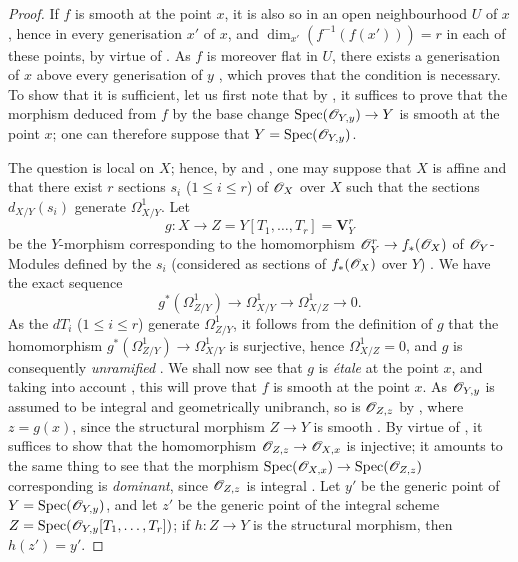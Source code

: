 \begin{proof}
If $f$ is smooth at the point $x$, it is also so in an open neighbourhood $U$ of $x$, hence in every generisation $x'$ of $x$, and $\dim_{x'}(f^{-1}(f(x')))=r$ in each of these points, by virtue of .
As $f$ is moreover flat in $U$, there exists a generisation of $x$ above every generisation of $y$ , which proves that the condition is necessary.
To show that it is sufficient, let us first note that by , it suffices to prove that the morphism deduced from $f$ by the base change $\operatorname{Spec}(\mathscr{O}_{Y,y})\to Y$ is smooth at the point $x$; one can therefore suppose that $Y=\operatorname{Spec}(\mathscr{O}_{Y,y})$.

The question is local on $X$; hence, by  and , one may suppose that $X$ is affine and that there exist $r$ sections $s_i$ ($1\leq i\leq r$) of $\mathscr{O}_X$ over $X$ such that the sections $d_{X/Y}(s_i)$ generate $\varOmega^1_{X/Y}$.
Let
\[
  g:X\to Z=Y[T_1,\ldots,T_r]=\mathbf{V}_{Y}^r
\]
be the $Y$-morphism corresponding to the homomorphism $\mathscr{O}_{Y}^r\to f_*(\mathscr{O}_X)$ of $\mathscr{O}_Y$-Modules defined by the $s_i$ (considered as sections of $f_*(\mathscr{O}_X)$ over $Y$) .
We have the exact sequence 
\[
  g^*(\varOmega^1_{Z/Y})\to\varOmega^1_{X/Y}\to\varOmega^1_{X/Z}\to 0.
\]
As the $dT_i$ ($1\leq i\leq r$) generate $\varOmega^1_{Z/Y}$, it follows from the definition of $g$ that the homomorphism $g^*(\varOmega^1_{Z/Y})\to\varOmega^1_{X/Y}$ is surjective, hence $\varOmega^1_{X/Z}=0$, and $g$ is consequently \emph{unramified} .
We shall now see that $g$ is \emph{\'etale} at the point $x$, and taking into account , this will prove that $f$ is smooth at the point $x$.
As $\mathscr{O}_{Y,y}$ is assumed to be integral and geometrically
unibranch, so is $\mathscr{O}_{Z,z}$ by , where $z=g(x)$, since the structural morphism $Z\to Y$ is smooth .
By virtue of , it suffices to show that the homomorphism $\mathscr{O}_{Z,z}\to\mathscr{O}_{X,x}$ is injective; it amounts to the same thing to see that the morphism $\operatorname{Spec}(\mathscr{O}_{X,x})\to\operatorname{Spec}(\mathscr{O}_{Z,z})$ corresponding is \emph{dominant}, since $\mathscr{O}_{Z,z}$ is integral .
Let $y'$ be the generic point of $Y=\operatorname{Spec}(\mathscr{O}_{Y,y})$, and let $z'$ be the generic point of the integral scheme $Z=\operatorname{Spec}(\mathscr{O}_{Y,y}[T_1,\ldots,T_r])$; if $h:Z\to Y$ is the structural morphism, then $h(z')=y'$.

\end{proof}
